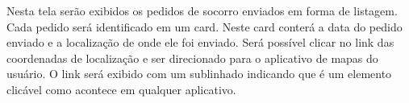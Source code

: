 Nesta tela serão exibidos os pedidos de socorro enviados em forma de listagem. Cada pedido será identificado em um card. Neste card conterá a data do pedido enviado e a localização de onde ele foi enviado. Será possível clicar no link das coordenadas de localização e ser direcionado para o aplicativo de mapas do usuário. O link será exibido com um sublinhado indicando que é um elemento clicável como acontece em qualquer aplicativo.
